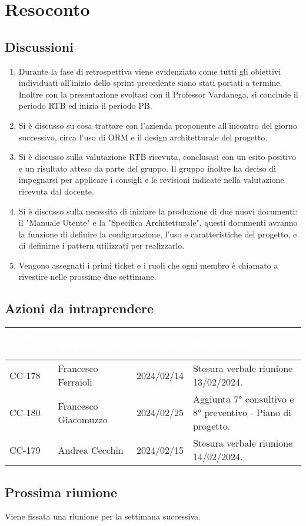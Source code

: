 \section{Resoconto} \label{sec:resoconto}
\subsection{Discussioni} \label{subsec:resdiscussione}
\begin{enumerate}
    \item Durante la fase di retrospettiva viene evidenziato come tutti gli obiettivi individuati all'inizio dello sprint precedente siano stati portati a termine. Inoltre con la presentazione svoltasi con il Professor Vardanega, si conclude il periodo RTB ed inizia il periodo PB.
    \item Si è discusso su cosa trattare con l'azienda proponente all'incontro del giorno successivo, circa l'uso di ORM e il design architetturale del progetto.
    \item Si è discusso sulla valutazione RTB ricevuta, conclusasi con un esito positivo e un risultato atteso da parte del gruppo. Il gruppo inoltre ha deciso di impegnarsi per applicare i consigli e le revisioni indicate nella valutazione ricevuta dal docente.
    \item Si è discusso sulla necessità di iniziare la produzione di due nuovi documenti: il "Manuale Utente" e la "Specifica Architetturale", questi documenti avranno la funzione di definire la configurazione, l'uso e caratteristiche del progetto, e di definirne i pattern utilizzati per realizzarlo.
    \item Vengono assegnati i primi ticket e i ruoli che ogni membro è chiamato a rivestire nelle prossime due settimane.
\end{enumerate}

\subsection{Azioni da intraprendere}
{
    \setlength{\tabcolsep}{10pt}
            \renewcommand{\arraystretch}{1.5}
            \begin{xltabular}{\textwidth}{| l | l | l | X |}
                 \hline
                 \textbf{\textcolor{white}{Codice issue}} & \textbf{\textcolor{white}{Assegnatario}} & \textbf{\textcolor{white}{Scadenza}} & \textbf{\textcolor{white}{Descrizione}} \\
                 \hline
                 CC-178 & Francesco Ferraioli & 2024/02/14 & Stesura verbale riunione 13/02/2024.\\
                 \hline
                 CC-180 & Francesco Giacomuzzo & 2024/02/25 & Aggiunta 7° consultivo e 8° preventivo - Piano di progetto.\\
                 \hline
                 CC-179 & Andrea Cecchin & 2024/02/15 & Stesura verbale riunione 14/02/2024.\\
                 \hline
                 
            \end{xltabular}
}

\subsection{Prossima riunione} \label{subsec:riunione}
Viene fissata una riunione per la settimana successiva.